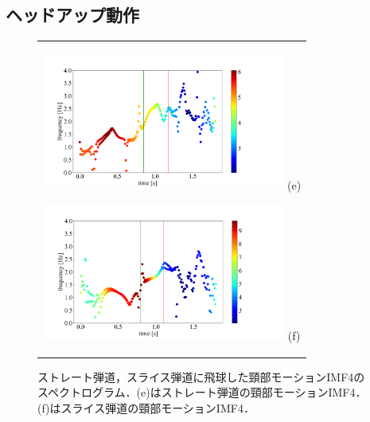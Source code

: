 \subsection{ヘッドアップ動作}
\begin{figure}
    \begin{center}
        \begin{tabular}{c}
            \begin{minipage}{0.5\hsize}
                \begin{center}
                    \includegraphics[width=8cm]{./images/straight_data/neck/IMF4.png}
                    (e)
                \end{center}
            \end{minipage}

            \begin{minipage}{0.5\hsize}
                \begin{center}
                    \includegraphics[width=8cm]{./images/headup_data/neck/IMF4.png}
                    (f)
                \end{center}
            \end{minipage}
        \end{tabular}
    \end{center}
    \caption{ストレート弾道，スライス弾道に飛球した頸部モーションIMF4のスペクトログラム．(e)はストレート弾道の頸部モーションIMF4．(f)はスライス弾道の頸部モーションIMF4．}
\end{figure}

